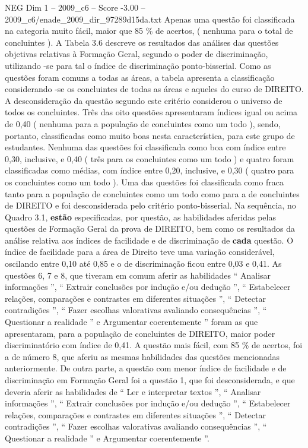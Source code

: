 \begin{textsample}{NEG Dim 1 – 2009\_c6 – Score -3.00 – 2009\_c6/enade\_2009\_dir\_97289d15da.txt}
Apenas uma questão foi classificada na categoria muito fácil, maior que 85 \% de acertos, ( nenhuma para o total de concluintes ).
A Tabela 3.6 descreve os resultados das análises das questões objetivas relativas à Formação Geral, segundo o poder de discriminação, utilizando -se para tal o índice de discriminação ponto-bisserial.
Como as questões foram comuns a todas as áreas, a tabela apresenta a classificação considerando -se os concluintes de todas as áreas e aqueles do curso de DIREITO.
A desconsideração da questão segundo este critério considerou o universo de todos os concluintes.
Três das oito questões apresentaram índices igual ou acima de 0,40 ( nenhuma para a população de concluintes como um todo ), sendo, portanto, classificadas como muito boas nesta característica, para este grupo de estudantes.
Nenhuma das questões foi classificada como boa com índice entre 0,30, inclusive, e 0,40 ( três para os concluintes como um todo ) e quatro foram classificadas como médias, com índice entre 0,20, inclusive, e 0,30 ( quatro para os concluintes como um todo ).
Uma das questões foi classificada como fraca tanto para a população de concluintes como um todo como para a de concluintes de DIREITO e foi desconsiderada pelo critério ponto-bisserial.
Na sequência, no Quadro 3.1, \textbf{estão} especificadas, por questão, as habilidades aferidas pelas questões de Formação Geral da prova de DIREITO, bem como os resultados da análise relativa aos índices de facilidade e de discriminação de \textbf{cada} questão.
O índice de facilidade para a área de Direito teve uma variação considerável, oscilando entre 0,10 até 0,85 e o de discriminação ficou entre 0,03 e 0,41.
As questões 6, 7 e 8, que tiveram em comum aferir as habilidades “ Analisar informações ”, “ Extrair conclusões por indução e/ou dedução ”, “ Estabelecer relações, comparações e contrastes em diferentes situações ”, “ Detectar contradições ”, “ Fazer escolhas valorativas avaliando consequências ”, “ Questionar a realidade ” e Argumentar coerentemente ” foram as que apresentaram, para a população de concluintes de DIREITO, maior poder discriminatório com índice de 0,41.
A questão mais fácil, com 85 \% de acertos, foi a de número 8, que aferiu as mesmas habilidades das questões mencionadas anteriormente.
De outra parte, a questão com menor índice de facilidade e de discriminação em Formação Geral foi a questão 1, que foi desconsiderada, e que deveria aferir as habilidades de “ Ler e interpretar textos ”, “ Analisar informações ”, “ Extrair conclusões por indução e/ou dedução ”, “ Estabelecer relações, comparações e contrastes em diferentes situações ”, “ Detectar contradições ”, “ Fazer escolhas valorativas avaliando consequências ”, “ Questionar a realidade ” e Argumentar coerentemente ”.

\end{textsample}
